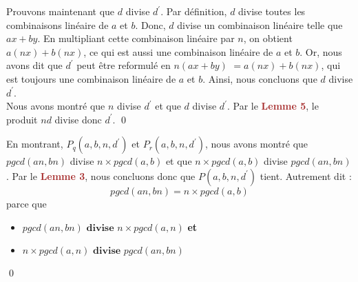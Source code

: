 \documentclass[16pt]{report}
\begin{document}
\begin{multicols*}{2}
\begin{Preuve*}{}{}
        Prouvons maintenant que $d$ divise $d^{\prime}$. Par définition, $d$ divise 
        toutes les combinaisons linéaire de $a$ et $b$. Donc, $d$  divise un combinaison linéaire telle que 
        $ax + by$. En multipliant cette combinaison linéaire par $n$, on obtient $a(nx) + b(nx)$, ce qui est 
        aussi une combinaison linéaire de $a$ et $b$. Or, nous avons dit que $d^{\prime}$ peut être 
        reformulé en \textcolor{myp}{$n(ax + by)$} $ = a(nx) + b(nx)$, qui est toujours 
        une combinaison linéaire de $a$ et $b$. Ainsi, nous concluons que $d$ divise $d^{\prime}$. \vspace{1em} \\ 
        Nous avons montré que $n$ divise $d^{\prime}$ et que $d$ divise $d^{\prime}$. 
        Par le \textbf{\textcolor{brown}{Lemme 5}}, le produit $nd$ divise donc $d^{\prime}$. \qed   
    \end{Preuve*}


    En montrant, $P_q(a,b, n, d^{\prime})$ et $P_r(a,b, n, d^{\prime})$, nous avons montré que 
    $pgcd(an, bn)$ divise $n\times pgcd(a,b)$ et que $n \times pgcd(a, b)$ divise $pgcd(an, bn)$. 
    Par le \textbf{\textcolor{brown}{Lemme 3}}, nous concluons donc que $P(a,b,n, d^{\prime})$ tient. 
    Autrement dit : 
    \[ pgcd(an, bn) =  n \times pgcd(a, b) \]
    parce que 
    \begin{itemize}
        \item $pgcd(an, bn) \textbf{ divise }  n\times pgcd(a,n)$ \textbf{et} \\ 
        \item $n\times pgcd(a,n) \textbf{ divise } pgcd(an, bn)$
    \end{itemize}
    \qed
\end{multicols*}
  
\end{document}

